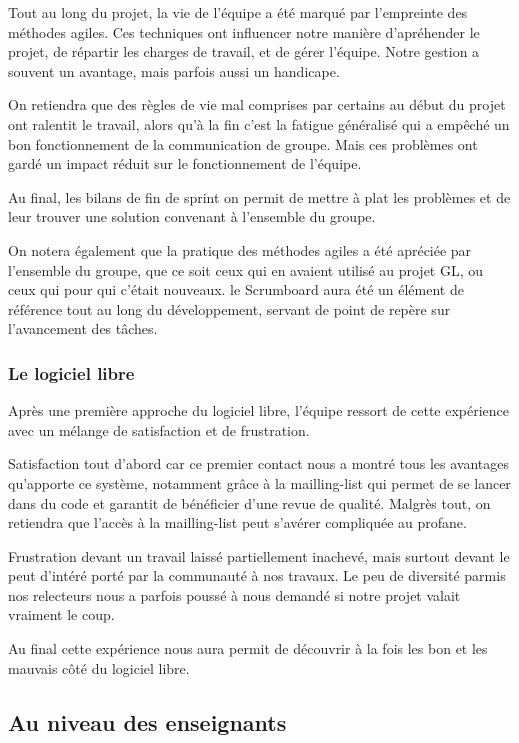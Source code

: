 \documentclass[11pt]{article}
\begin{document}
Tout au long du projet, la vie de l'équipe a été marqué par l'empreinte des
méthodes agiles. Ces techniques ont influencer notre manière d'apréhender 
le projet, de répartir les charges de travail, et de gérer l'équipe. Notre
gestion a souvent un avantage, mais parfois aussi un handicape. 

On retiendra que des règles de vie mal comprises par certains au début du 
projet ont ralentit le travail, alors qu'à la fin c'est la fatigue généralisé
qui a empêché un bon fonctionnement de la communication de groupe. Mais ces
problèmes ont gardé un impact réduit sur le fonctionnement de l'équipe. 

Au final, les bilans de fin de sprint on permit de mettre à plat les problèmes
et de leur trouver une solution convenant à l'ensemble du groupe.

On notera également que la pratique des méthodes agiles a été apréciée par 
l'ensemble du groupe, que ce soit ceux qui en avaient utilisé au projet GL,
ou ceux qui pour qui c'était nouveaux. le Scrumboard aura été un élément de 
référence tout au long du développement, servant de point de repère sur 
l'avancement des tâches.

\subsubsection*{Le logiciel libre }

Après une première approche du logiciel libre, l'équipe ressort de cette 
expérience avec un mélange de satisfaction et de frustration.

Satisfaction tout d'abord car ce premier contact nous a montré tous les 
avantages qu'apporte ce système, notamment grâce à la mailling-list qui 
permet de se lancer dans du code et garantit de bénéficier d'une revue de
qualité. Malgrès tout, on retiendra que l'accès à la mailling-list peut 
s'avérer compliquée au profane.

Frustration devant un travail laissé partiellement inachevé, mais surtout
devant le peut d'intéré porté par la communauté à nos travaux. Le peu de
diversité parmis nos relecteurs nous a parfois poussé à nous demandé si
notre projet valait vraiment le coup. 

Au final cette expérience nous aura permit de découvrir à la fois les bon
et les mauvais côté du logiciel libre.


\subsection*{Au niveau des enseignants}
\end{document}
